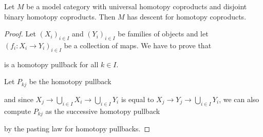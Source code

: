 \begin{corollary}\label{cor:disjointImpliesDescent}
    Let $M$ be a model category with universal homotopy coproducts and disjoint binary homotopy coproducts.
    Then $M$ has descent for homotopy coproducts.
    \begin{proof}
        Let $\left(X_i\right)_{i\in I}$ and $\left(Y_i\right)_{i\in I}$ be families of objects and let $\left(f_i\colon X_i\to Y_i\right)_{i\in I}$ be a collection of maps.
        We have to prove that 
        \begin{center}
        \end{center}
        is a homotopy pullback for all $k\in I$.
        
        Let $P_{kj}$ be the homotopy pullback
        \begin{center}
        \end{center}
        and since $X_j\to\bigcup\limits_{i\in I}X_i\to\bigcup\limits_{i\in I}Y_i$ is equal to $X_j\to Y_j\to\bigcup\limits_{i\in I}Y_i$, we can also compute $P_{kj}$ as the successive homotopy pullback
        \begin{center}
        \end{center}
        by the pasting law for homotopy pullbacks.


\end{proof}
\end{corollary}
